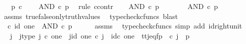 \begin{isabellebody}
\ \ \ {\isachardoublequoteopen}p\ {\isasymin}\isactrlsub c\ {\isasymOmega}{\isachardoublequoteclose}\isanewline
\ \ \ {\isachardoublequoteopen}AND\ {\isasymcirc}\isactrlsub c\ {\isasymlangle}p{\isacharcomma}{\kern0pt}{\isasymf}{\isasymrangle}\ {\isacharequal}{\kern0pt}\ {\isasymf}{\isachardoublequoteclose}\isanewline
%
\isadelimproof
%
\endisadelimproof
%
\isatagproof
{}\isamarkupfalse%
{\isacharparenleft}{\kern0pt}rule\ ccontr{\isacharparenright}{\kern0pt}\isanewline
\ \ \isamarkupfalse%
\ {\isachardoublequoteopen}AND\ {\isasymcirc}\isactrlsub c\ {\isasymlangle}p{\isacharcomma}{\kern0pt}{\isasymf}{\isasymrangle}\ {\isasymnoteq}\ {\isasymf}{\isachardoublequoteclose}\isanewline
\ \ \isamarkupfalse%
\ \isamarkupfalse%
\ {\isachardoublequoteopen}AND\ {\isasymcirc}\isactrlsub c\ {\isasymlangle}p{\isacharcomma}{\kern0pt}{\isasymf}{\isasymrangle}\ {\isacharequal}{\kern0pt}\ {\isasymt}{\isachardoublequoteclose}\isanewline
\ \ \ \ \isamarkupfalse%
\ assms\ true{\isacharunderscore}{\kern0pt}false{\isacharunderscore}{\kern0pt}only{\isacharunderscore}{\kern0pt}truth{\isacharunderscore}{\kern0pt}values\ \isamarkupfalse%
\ {\isacharparenleft}{\kern0pt}typecheck{\isacharunderscore}{\kern0pt}cfuncs{\isacharcomma}{\kern0pt}\ blast{\isacharparenright}{\kern0pt}\isanewline
\ \ \isamarkupfalse%
\ \isamarkupfalse%
\ {\isachardoublequoteopen}{\isasymt}\ {\isasymcirc}\isactrlsub c\ id\ one\ {\isacharequal}{\kern0pt}\ AND\ {\isasymcirc}\isactrlsub c\ {\isasymlangle}p{\isacharcomma}{\kern0pt}{\isasymf}{\isasymrangle}{\isachardoublequoteclose}\isanewline
\ \ \ \ \isamarkupfalse%
\ assms\ \isamarkupfalse%
\ {\isacharparenleft}{\kern0pt}typecheck{\isacharunderscore}{\kern0pt}cfuncs{\isacharcomma}{\kern0pt}\ simp\ add{\isacharcolon}{\kern0pt}\ id{\isacharunderscore}{\kern0pt}right{\isacharunderscore}{\kern0pt}unit{}{\isacharparenright}{\kern0pt}\isanewline
\ \ \isamarkupfalse%
\ \isamarkupfalse%
\ j\ \ j{\isacharunderscore}{\kern0pt}type{\isacharcolon}{\kern0pt}\ {\isachardoublequoteopen}j\ {\isasymin}\isactrlsub c\ one{\isachardoublequoteclose}\ \ j{\isacharunderscore}{\kern0pt}id{\isacharcolon}{\kern0pt}\ {\isachardoublequoteopen}{\isasymbeta}\isactrlbsub one\isactrlesub \ {\isasymcirc}\isactrlsub c\ j\ {\isacharequal}{\kern0pt}\ id\isactrlsub c\ one{\isachardoublequoteclose}\ \ tt{\isacharunderscore}{\kern0pt}j{\isacharunderscore}{\kern0pt}eq{\isacharunderscore}{\kern0pt}fp{\isacharcolon}{\kern0pt}\ {\isachardoublequoteopen}{\isasymlangle}{\isasymt}{\isacharcomma}{\kern0pt}{\isasymt}{\isasymrangle}\ {\isasymcirc}\isactrlsub c\ j\ {\isacharequal}{\kern0pt}\ {\isasymlangle}p{\isacharcomma}{\kern0pt}{\isasymf}{\isasymrangle}{\isachardoublequoteclose}\isanewline

\end{isabellebody}
